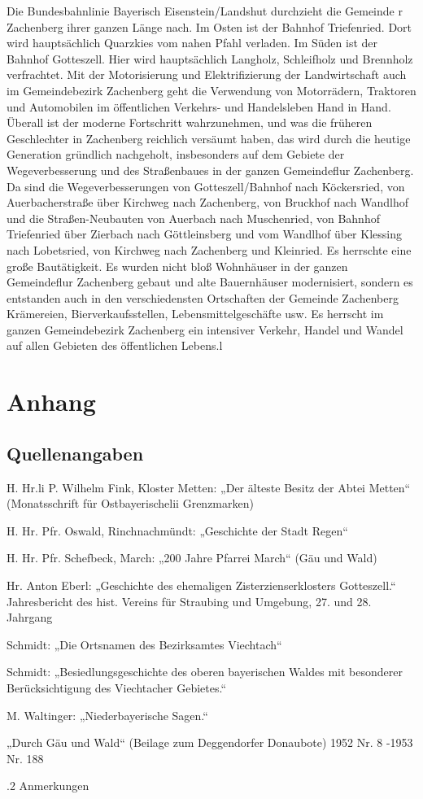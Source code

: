 \documentclass{book}
\begin{document}
Die Bundesbahnlinie Bayerisch Eisenstein/Landshut durchzieht die Gemeinde r
Zachenberg ihrer ganzen Länge nach. Im Osten ist der Bahnhof Triefenried. Dort
wird hauptsächlich Quarzkies vom nahen Pfahl verladen. Im Süden ist der Bahnhof
Gotteszell. Hier wird hauptsächlich Langholz, Schleifholz und Brennholz
verfrachtet. Mit der Motorisierung und Elektrifizierung der Landwirtschaft auch
im Gemeindebezirk Zachenberg geht die Verwendung von Motorrädern, Traktoren und
Automobilen im öffentlichen Verkehrs- und Handelsleben Hand in Hand. Überall ist
der moderne Fortschritt wahrzunehmen, und was die früheren Geschlechter in
Zachenberg reichlich versäumt haben, das wird durch die heutige Generation
gründlich nachgeholt, insbesonders auf dem Gebiete der Wegeverbesserung und des
Straßenbaues in der ganzen Gemeindeflur Zachenberg. Da sind die
Wegeverbesserungen von Gotteszell/Bahnhof nach Köckersried, von Auerbacherstraße
über Kirchweg nach Zachenberg, von Bruckhof nach Wandlhof und die
Straßen-Neubauten von Auerbach nach Muschenried, von Bahnhof Triefenried über
Zierbach nach Göttleinsberg und vom Wandlhof über Klessing nach Lobetsried, von
Kirchweg nach Zachenberg und Kleinried. Es herrschte eine große Bautätigkeit. Es
wurden nicht bloß Wohnhäuser in der ganzen Gemeindeflur Zachenberg gebaut und
alte Bauernhäuser modernisiert, sondern es entstanden auch in den
verschiedensten Ortschaften der Gemeinde Zachenberg Krämereien,
Bierverkaufsstellen, Lebensmittelgeschäfte usw. Es herrscht im ganzen
Gemeindebezirk Zachenberg ein intensiver Verkehr, Handel und Wandel auf allen
Gebieten des öffentlichen Lebens.l

\part{Anhang}

\chapter{Quellenangaben}

H. Hr.li P. Wilhelm Fink, Kloster Metten: „Der älteste Besitz der Abtei Metten“
(Monatsschrift für Ostbayerischelii Grenzmarken)

H. Hr. Pfr. Oswald, Rinchnachmündt: „Geschichte der Stadt Regen“

H. Hr. Pfr. Schefbeck, March: „200 Jahre Pfarrei March“ (Gäu und Wald)

Hr. Anton Eberl: „Geschichte des ehemaligen Zisterzienserklosters Gotteszell.“
Jahresbericht des hist. Vereins für Straubing und Umgebung, 27. und 28. Jahrgang

Schmidt: „Die Ortsnamen des Bezirksamtes Viechtach“

Schmidt: „Besiedlungsgeschichte des oberen bayerischen Waldes mit besonderer
Berücksichtigung des Viechtacher Gebietes.“

M. Waltinger: „Niederbayerische Sagen.“

„Durch Gäu und Wald“ (Beilage zum Deggendorfer Donaubote) 1952 Nr. 8 -1953 Nr.
188

.2 Anmerkungen
\end{document}
